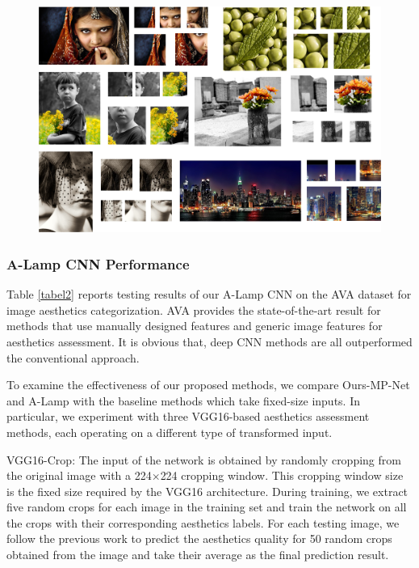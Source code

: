 \documentclass[10pt,twocolumn,letterpaper]{article}
\begin{document}
\begin{figure}
	\centering
	\includegraphics[scale=0.15]{figures/patch_selection.jpg}
	\label{patches}
\end{figure}

\subsubsection{A-Lamp CNN Performance}
Table \ref{tabel2} reports testing results of our A-Lamp CNN on the AVA dataset for image aesthetics categorization. AVA \cite{MMP2012:AVA} provides the state-of-the-art result for methods that use manually designed features and generic image features for aesthetics assessment. It is obvious that, deep CNN methods are all outperformed the conventional approach.

To examine the effectiveness of our proposed methods, we compare Ours-MP-Net and A-Lamp with the baseline methods which take fixed-size inputs. In particular, we experiment with three VGG16-based aesthetics assessment methods, each operating on a different type of transformed input.

VGG16-Crop: The input of the network is obtained by randomly cropping from the original image with a 224$\times$224 cropping window. This cropping window size is the fixed size required by the VGG16 architecture. During training, we extract five random crops for each image in the training
set and train the network on all the crops with their corresponding
aesthetics labels. For each testing image, we follow the previous work \cite{Lu:2015:ICCV} to predict the aesthetics quality for 50 random crops obtained from the image and take their average as the final prediction result.
\end{document}

